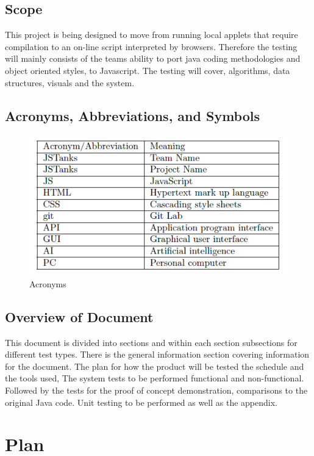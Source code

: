 \documentclass{article}
\begin{document}
\subsection{Scope}
This project is being designed to move from running local applets that require 
compilation to an on-line script interpreted by browsers. Therefore the 
testing will mainly consists of the teams ability to port java coding 
methodologies and object oriented styles, to Javascript. The testing will 
cover, algorithms, data structures, visuals and the system. 

\subsection{Acronyms, Abbreviations, and Symbols}
\begin{figure}[H]
	\centering
	\includegraphics[width=\textwidth]{fig1.png}
	\caption{Acronyms}
\end{figure}

\subsection{Overview of Document}
This document is divided into sections and within each section subsections for 
different test types. There is the general information section covering 
information for the document. The plan for how the product will be tested the 
schedule and the tools used, The system tests to be performed functional and 
non-functional. Followed by the tests for the proof of concept demonstration, 
comparisons to the original Java code. Unit testing to be performed as well as 
the appendix. 

\section{Plan}
\end{document}
